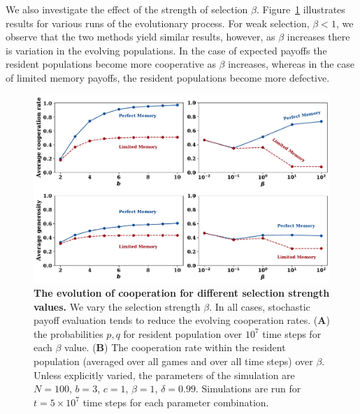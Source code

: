 \documentclass[11pt]{article}
\theoremstyle{plainCl1}
\theoremstyle{plainCl2}
\begin{document}
We also investigate the effect of the strength of selection $\beta$.
Figure~\ref{fig:cooperation_rate_over_betas} illustrates results for various
runs of the evolutionary process. For weak selection, \(\beta < 1\), we observe
that the two methods yield similar results, however, as \(\beta\) increases
there is variation in the evolving populations. In the case of expected payoffs
the resident populations become more cooperative as \(\beta\) increases, whereas
in the case of limited memory payoffs, the resident populations become more
defective.

\begin{figure}[!htbp]
  \centering
    \includegraphics[width=\textwidth]{static/cooperation_rate_over_b.pdf}
\caption{{\bf The evolution of cooperation for different selection strength values.}
We vary the selection strength $\beta$. In all cases, stochastic payoff
evaluation tends to reduce the evolving cooperation rates. ({\bf A}) the
probabilities \(p, q\) for resident population over \(10^7\) time steps for each
\(\beta\) value. ({\bf B}) The cooperation rate within the resident population
(averaged over all games and over all time steps) over \(\beta\). Unless
explicitly varied, the parameters of the simulation are $N\!=\!100$, $b\!=\!3$,
$c\!=\!1$, $\beta\!=\!1$, $\delta\!=\!0.99$. Simulations are run for
$t\!=\!5\times 10^7$ time steps for each parameter
combination.}\label{fig:cooperation_rate_over_betas}
\end{figure}
\end{document}
